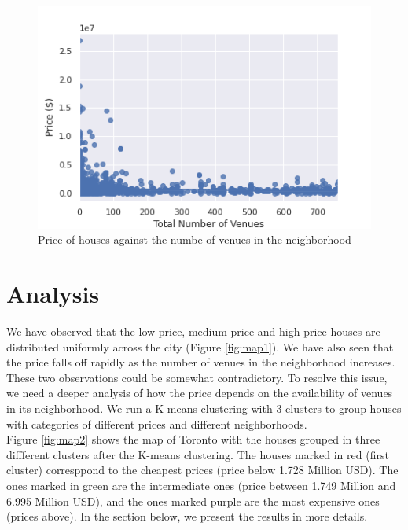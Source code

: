 \documentclass{article}
\begin{document}
\begin{figure}[hbt!]
	
	\includegraphics[width=\textwidth]{hp.png}
	\caption{Price of houses against the numbe of venues in the neighborhood}
	\label{fig:vp}
	
\end{figure}

\section{Analysis}

We have observed that the low price, medium price and high price houses are distributed uniformly across the city (Figure \ref{fig:map1}). We have also seen that the price falls off rapidly as the number of venues in the neighborhood increases. These two observations could be somewhat contradictory. To resolve this issue, we need a deeper analysis of how the price depends on the availability of venues in its neighborhood. We run a K-means clustering with 3 clusters to group houses with categories of different prices and different neighborhoods. \\

Figure \ref{fig:map2} shows the map of Toronto with the houses grouped in three diffferent clusters after the K-means clustering. The houses marked in red (first cluster) corresppond to the cheapest prices (price below 1.728 Million USD). The ones marked in green are the intermediate ones (price between 1.749 Million and 6.995 Million USD), and the ones marked purple are the most expensive ones (prices above). In the section below, we present the results in more details.
\end{document}
